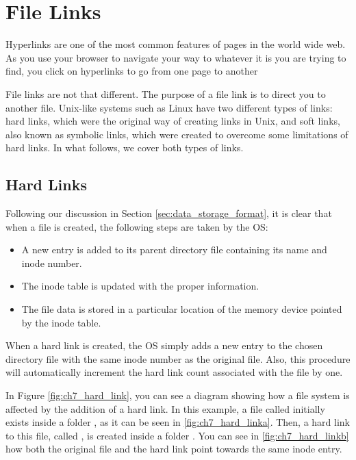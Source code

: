 \chapter{File Links}\label{ch:file_links}

Hyperlinks are one of the most common features of pages in the world wide web. As you use your browser to navigate your way to whatever it is you are trying to find, you click on hyperlinks to go from one page to another

File links are not that different. The purpose of a file link is to direct you to another file. Unix-like systems such as Linux have two different types of links: hard links, which were the original way of creating links in Unix, and soft links, also known as symbolic links, which were created to overcome some limitations of hard links. In what follows, we cover both types of links.

\section{Hard Links}

Following our discussion in Section \ref{sec:data_storage_format}, it is clear that when a file is created, the following steps are taken by the \acs{OS}:
\begin{itemize}
\item A new entry is added to its parent directory file containing its name and inode number.
\item The inode table is updated with the proper information.
\item The file data is stored in a particular location of the memory device pointed by the inode table.
\end{itemize}

When a hard link is created, the \acs{OS} simply adds a new entry to the chosen directory file with the same inode number as the original file. Also, this procedure will automatically increment the hard link count associated with the file by one.

In Figure \ref{fig:ch7_hard_link}, you can see a diagram showing how a file system is affected by the addition of a hard link. In this example, a file called  initially exists inside a folder , as it can be seen in \ref{fig:ch7_hard_linka}. Then, a hard link to this file, called , is created inside a folder . You can see in \ref{fig:ch7_hard_linkb} how both the original file  and the hard link  point towards the same inode entry.

